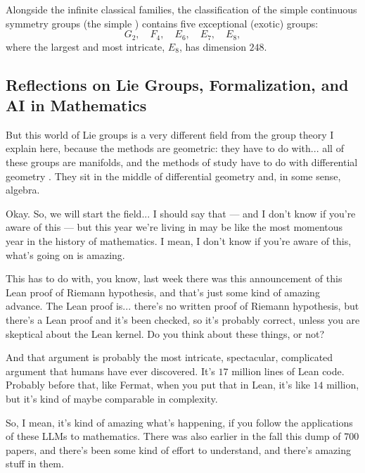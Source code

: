 \begin{content}
Alongside the infinite classical families, the classification of the simple continuous symmetry groups (the simple ) contains five exceptional (exotic) groups:
\[
G_2, \quad F_4, \quad E_6, \quad E_7, \quad E_8,
\]
where the largest and most intricate, $E_8$, has dimension $248$.
\end{content}

\subsection{Reflections on Lie Groups, Formalization, and AI in Mathematics}

\begin{speech}[00:41:32 - 00:43:31]
But this world of Lie groups is a very different field from the group theory I explain here, because the methods are geometric: they have to do with... all of these groups are manifolds, and the methods of study have to do with differential geometry . They sit in the middle of differential geometry and, in some sense, algebra.

Okay. So, we will start the field... I should say that --- and I don't know if you're aware of this --- but this year we're living in may be like the most momentous year in the history of mathematics. I mean, I don't know if you're aware of this, what's going on is amazing.

This has to do with, you know, last week there was this announcement of this Lean proof of Riemann hypothesis, and that's just some kind of amazing advance. The Lean proof is... there's no written proof of Riemann hypothesis, but there's a Lean proof and it's been checked, so it's probably correct, unless you are skeptical about the Lean kernel. Do you think about these things, or not?

And that argument is probably the most intricate, spectacular, complicated argument that humans have ever discovered. It's $17$ million lines of Lean code. Probably before that, like Fermat, when you put that in Lean, it's like $14$ million, but it's kind of maybe comparable in complexity.

So, I mean, it's kind of amazing what's happening, if you follow the applications of these LLMs to mathematics. There was also earlier in the fall this dump of $700$ papers, and there's been some kind of effort to understand, and there's amazing stuff in them.
\end{speech}

